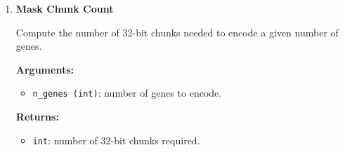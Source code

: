 \begin{enumerate}
        \textbf{Arguments:}
        \begin{itemize}
            \item \lstinline!ancestor (array-like)!: vector of shape \lstinline!(n_dims)!.
            \item \lstinline!genes (array-like)!: 2D array of shape \lstinline!(n_dims, n_genes)! containing all genes.
            \item \lstinline!rdi_threshold (float)!: maximum allowed residual distance to \lstinline!ancestor!.
            \item \lstinline!filtered_paralogs_mask (array-like)!: int32 mask (chunks of 32 bits) for \lstinline!n_genes!.
            \item \lstinline!max_subset_size (int)!: desired maximum subset size (may be adjusted).
            \item \lstinline!paralog_norms (array-like)!: float64 norms for all genes (\lstinline!n_genes!).
            \item \lstinline!sorted_paralog_norms_perm (array-like)!: int32 permutation of norms (\lstinline!n_genes!).
        \end{itemize}

        \textbf{Returns:}
        \begin{itemize}
            \item \lstinline!dict!: \{ \lstinline!'n_results': int!, \lstinline!'results': np.ndarray! \}
        \end{itemize}

\begin{lstlisting}[language=Python, caption={Subfunctionalization Detection}]
n_results, results = tox_detect_subfunctionalization(
    ancestor, genes, rdi_threshold,
    filtered_paralogs_mask, max_subset_size,
    paralog_norms, sorted_paralog_norms_perm
).values()
\end{lstlisting}


    \item \textbf{Mask Chunk Count}

        Compute the number of 32-bit chunks needed to encode a given number of genes.

        \textbf{Arguments:}
        \begin{itemize}
            \item \lstinline!n_genes (int)!: number of genes to encode.
        \end{itemize}

        \textbf{Returns:}
        \begin{itemize}
            \item \lstinline!int!: number of 32-bit chunks required.
        \end{itemize}


\end{enumerate}

